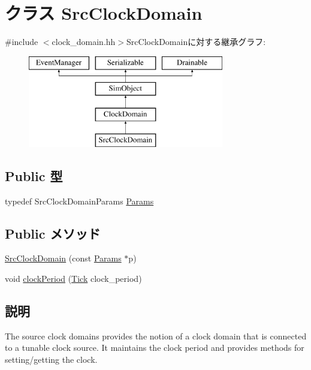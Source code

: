 \hypertarget{classSrcClockDomain}{
\section{クラス SrcClockDomain}
\label{classSrcClockDomain}
}


{\ttfamily \#include $<$clock\_\-domain.hh$>$}SrcClockDomainに対する継承グラフ:\begin{figure}[H]
\begin{center}
\leavevmode
\includegraphics[height=4cm]{classSrcClockDomain}
\end{center}
\end{figure}
\subsection*{Public 型}
\begin{DoxyCompactItemize}
\item 
typedef SrcClockDomainParams \hyperlink{classSrcClockDomain_a782eceafbcc65d65fa25b7ca97e38b2d}{Params}
\end{DoxyCompactItemize}
\subsection*{Public メソッド}
\begin{DoxyCompactItemize}
\item 
\hyperlink{classSrcClockDomain_aae9e61f29a07480bc9efff8be6cc2459}{SrcClockDomain} (const \hyperlink{classSrcClockDomain_a782eceafbcc65d65fa25b7ca97e38b2d}{Params} $\ast$p)
\item 
void \hyperlink{classSrcClockDomain_a799c3553bc74c99bf84d42e1750ad07e}{clockPeriod} (\hyperlink{base_2types_8hh_a5c8ed81b7d238c9083e1037ba6d61643}{Tick} clock\_\-period)
\end{DoxyCompactItemize}


\subsection{説明}
The source clock domains provides the notion of a clock domain that is connected to a tunable clock source. It maintains the clock period and provides methods for setting/getting the clock. 

